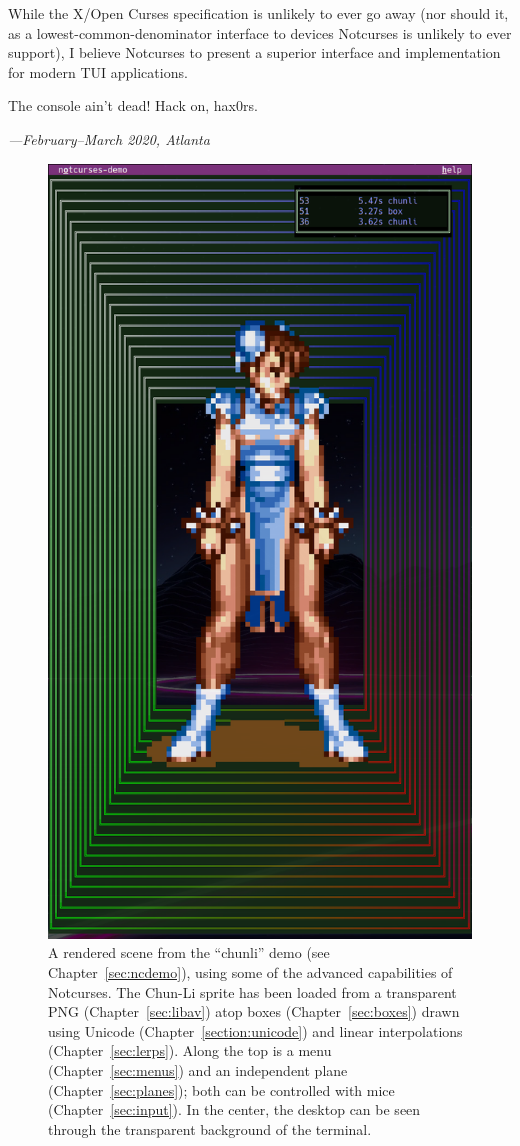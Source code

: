 \documentclass[letterpaper,10pt]{article}
\begin{document}
While the X/Open Curses specification is unlikely to ever go away (nor should
it, as a lowest-common-denominator interface to devices Notcurses is unlikely
to ever support), I believe Notcurses to present a superior interface and
implementation for modern TUI applications.

The console ain't dead! Hack on, hax0rs.

\vfill

\begin{flushright}
  \textit{---February--March 2020, Atlanta}
\end{flushright}

\cleardoublepage

\vfill
\begin{figure}
\centering
\includegraphics[width=.65\linewidth]{media/chunli-box-front.png}
\caption[]{A rendered scene from the ``chunli'' demo (see Chapter~\ref{sec:ncdemo}),
  using some of the advanced capabilities of Notcurses. The Chun-Li sprite has
  been loaded from a transparent PNG (Chapter~\ref{sec:libav}) atop boxes
  (Chapter~\ref{sec:boxes}) drawn using Unicode (Chapter~\ref{section:unicode})
  and linear interpolations (Chapter~\ref{sec:lerps}). Along the top is a
  menu (Chapter~\ref{sec:menus}) and an independent plane (Chapter~\ref{sec:planes});
  both can be controlled with mice (Chapter~\ref{sec:input}). In the center,
  the desktop can be seen through the transparent background of the terminal.}
\end{figure}
\vfill
\cleardoublepage
\end{document}
